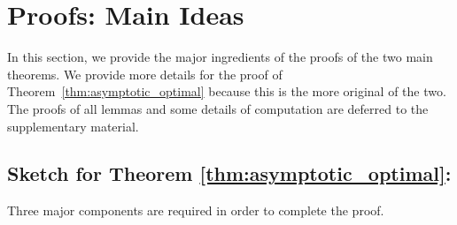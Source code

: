
\section{Proofs: Main Ideas}
\label{sec:proof}
In this section, we provide the major ingredients of the proofs of the two main theorems. We provide more details for the proof of Theorem~\ref{thm:asymptotic_optimal} because this is the more original of the two. The proofs of all lemmas and some details of computation are deferred %
to the supplementary material.


\subsection{Sketch for Theorem \ref{thm:asymptotic_optimal}:}

Three major components are required in order to complete the proof. 

